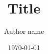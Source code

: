 \documentclass[12pt,a4paper]{article}
\begin{document}
\title{
  Title
}

\author{
    \Large{Author name}\\
  }

\date{\today}

\maketitle
\thispagestyle{empty}
\newpage
\setcounter{page}{1}


\end{document}
